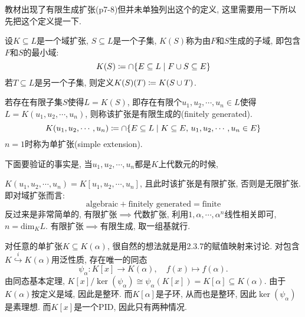 \documentclass{../solutions-cn}
\begin{document}
\begin{remark}
    教材出现了有限生成扩张(p7-8)但并未单独列出这个的定义, 这里需要用一下所以先把这个定义提一下.

    \begin{definitionstar}
        设$K \subseteq L$是一个域扩张, $S \subseteq L$是一个子集, $K(S)$称为由$F$和$S$生成的子域, 即包含$F$和$S$的最小域:
        \[
            K(S) \mathrel{\coloneqq} \cap \{E \subseteq L \mid F \cup S \subseteq E\} 
        \]
        若$T \subseteq L$是另一个子集, 则定义$K(S)(T) \mathrel{\coloneqq} K(S \cup T)$.

        若存在有限子集$S$使得$L = K(S)$, 即存在有限个$u_1, u_2, \cdots, u_n \in L$使得$L = K(u_1, u_2, \cdots, u_n)$, 则称该扩张是有限生成的(finitely generated).
        \[
            K(u_1, u_2, \cdots, u_n) \mathrel{\coloneqq} \cap \{E \subseteq L \mid K \subseteq E,\, u_1, u_2, \cdots, u_n \in E\}
        \]
        $n = 1$时称为单扩张(simple extension).
    \end{definitionstar}
    下面要验证的事实是, 当$u_1, u_2, \cdots, u_n$都是$K$上代数元的时候,\par
    $K(u_1, u_2, \cdots, u_n) = K[u_1, u_2, \cdots, u_n]$, 且此时该扩张是有限扩张, 否则是无限扩张. 即对域扩张而言:
    \[
        \text{algebraic} + \text{finitely generated} = \text{finite}
    \]
    反过来是非常简单的, 有限扩张$\implies$代数扩张, 利用$1, \alpha, \cdots, \alpha^n$线性相关即可, $n = \mathrm{dim}_K L$. 有限扩张$\implies$有限生成, 取一组基就行.

    对任意的单扩张$K \subseteq K(\alpha)$, 很自然的想法就是用2.3.7的赋值映射来讨论. 对包含$K \overset{i}\hookrightarrow K(\alpha)$用泛性质, 存在唯一的同态 
    \[
        \psi_\alpha:K[x] \to K(\alpha),\quad f(x) \mapsto f(\alpha).
    \]
    由同态基本定理, $K[x]/\ker(\psi_\alpha) \cong \psi_\alpha(K[x]) = K[\alpha] \subseteq K(\alpha)$. 由于$K(\alpha)$按定义是域, 因此是整环. 而$K[\alpha]$是子环, 从而也是整环, 因此$\ker(\psi_\alpha)$是素理想. 而$K[x]$是一个PID, 因此只有两种情况.


\end{remark}
\end{document}

